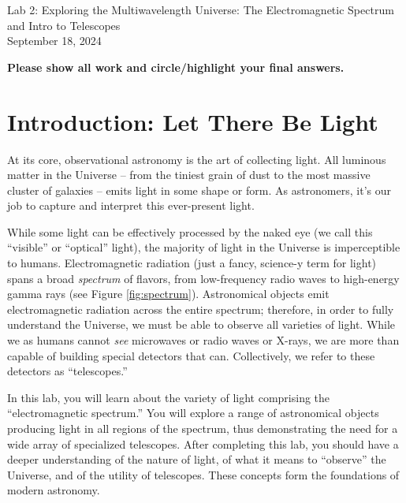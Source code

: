 \documentclass[11pt]{article}
\begin{document}
\begin{center}
\huge{Lab 2: Exploring the Multiwavelength Universe: The Electromagnetic Spectrum and Intro to Telescopes}\\ \medskip \Large{September 18, 2024}
\end{center}

\medskip \noindent
\textbf{Please show all work and circle/highlight your final answers.}

\section{Introduction: Let There Be Light}
At its core, observational astronomy is the art of collecting light. All luminous matter in the Universe -- from the tiniest grain of dust to the most massive cluster of galaxies -- emits light in some shape or form. As astronomers, it's our job to capture and interpret this ever-present light.

\medskip \noindent
While some light can be effectively processed by the naked eye (we call this ``visible'' or ``optical'' light), the majority of light in the Universe is imperceptible to humans. Electromagnetic radiation (just a fancy, science-y term for light) spans a broad \emph{spectrum} of flavors, from low-frequency radio waves to high-energy gamma rays (see Figure \ref{fig:spectrum}). Astronomical objects emit electromagnetic radiation across the entire spectrum; therefore, in order to fully understand the Universe, we must be able to observe all varieties of light. While we as humans cannot \emph{see} microwaves or radio waves or X-rays, we are more than capable of building special detectors that can. Collectively, we refer to these detectors as ``telescopes.''

\medskip \noindent
In this lab, you will learn about the variety of light comprising the ``electromagnetic spectrum.'' You will explore a range of astronomical objects producing light in all regions of the spectrum, thus demonstrating the need for a wide array of specialized telescopes. After completing this lab, you should have a deeper understanding of the nature of light, of what it means to ``observe'' the Universe, and of the utility of telescopes. These concepts form the foundations of modern astronomy. 

\end{document}
